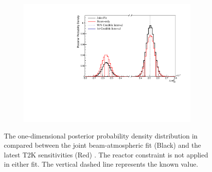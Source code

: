 \begin{figure}[h]
  \begin{subfigure}[t]{0.91\textwidth}
    \includegraphics[width=\textwidth, trim={0mm 0mm 0mm 0mm}, clip,page=1]{Figures/OA/JointFit_OA2020_Comp/ContourComparison_1D_dm32_BH_2_woRC_UnSmeared_CredibleInterval.pdf}
  \end{subfigure}
  \caption{The one-dimensional posterior probability density distribution in  compared between the joint beam-atmospheric fit (Black) and the latest T2K sensitivities (Red) \cite{Dunne2020-uf, t2k_tn_393}. The reactor constraint is not applied in either fit. The vertical dashed line represents the known value.}
  \label{fig:OscillationAnalysis_JointFit_OA2020_DM32}
\end{figure}


